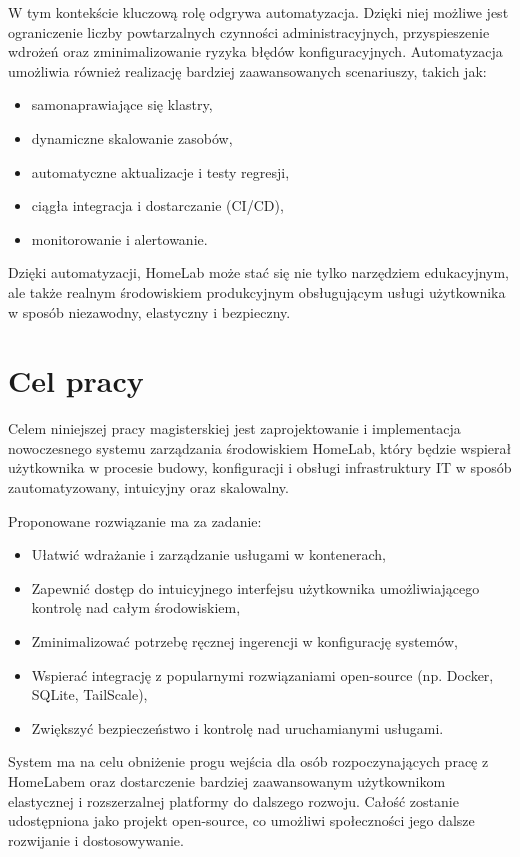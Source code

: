 W tym kontekście kluczową rolę odgrywa automatyzacja. Dzięki niej możliwe jest ograniczenie liczby powtarzalnych czynności administracyjnych, przyspieszenie wdrożeń oraz zminimalizowanie ryzyka błędów konfiguracyjnych. Automatyzacja umożliwia również realizację bardziej zaawansowanych scenariuszy, takich jak:
\begin{itemize}
    \item samonaprawiające się klastry,
    \item dynamiczne skalowanie zasobów,
    \item automatyczne aktualizacje i testy regresji,
    \item ciągła integracja i dostarczanie (CI/CD),
    \item monitorowanie i alertowanie.
\end{itemize}

Dzięki automatyzacji, HomeLab może stać się nie tylko narzędziem edukacyjnym, ale także realnym środowiskiem produkcyjnym obsługującym usługi użytkownika w sposób niezawodny, elastyczny i bezpieczny.
\section{Cel pracy}

Celem niniejszej pracy magisterskiej jest zaprojektowanie i implementacja nowoczesnego systemu zarządzania środowiskiem HomeLab, który będzie wspierał użytkownika w procesie budowy, konfiguracji i obsługi infrastruktury IT w sposób zautomatyzowany, intuicyjny oraz skalowalny. 

Proponowane rozwiązanie ma za zadanie:
\begin{itemize}
    \item Ułatwić wdrażanie i zarządzanie usługami w kontenerach,
    \item Zapewnić dostęp do intuicyjnego interfejsu użytkownika umożliwiającego kontrolę nad całym środowiskiem,
    \item Zminimalizować potrzebę ręcznej ingerencji w konfigurację systemów,
    \item Wspierać integrację z popularnymi rozwiązaniami open-source (np. Docker, SQLite, TailScale),
    \item Zwiększyć bezpieczeństwo i kontrolę nad uruchamianymi usługami.
\end{itemize}

System ma na celu obniżenie progu wejścia dla osób rozpoczynających pracę z HomeLabem oraz dostarczenie bardziej zaawansowanym użytkownikom elastycznej i rozszerzalnej platformy do dalszego rozwoju. Całość zostanie udostępniona jako projekt open-source, co umożliwi społeczności jego dalsze rozwijanie i dostosowywanie.

